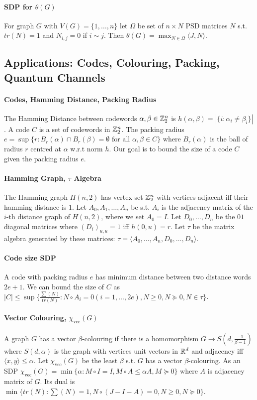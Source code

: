 \documentclass[letterpaper,11pt,oneside,onecolumn]{article}
\begin{document}
\paragraph{SDP for $\theta(G)$} For graph $G$ with $V(G) = \{1,\dots,n\}$ let $\Omega$ be set of $n\times N$ PSD matrices $N$ s.t. $tr(N) = 1$ and $N_{i,j} = 0$ if $i\sim j$. Then $\theta(G) = \max_{N \in \Omega} \langle J, N\rangle$.
\subsection*{Applications: Codes, Colouring, Packing, Quantum Channels}
\paragraph{Codes, Hamming Distance, Packing Radius} The Hamming Distance between codewords $\alpha,\beta \in \mathbb{Z}^n_2$ is $h(\alpha,\beta) = |\{i:\alpha_i \neq \beta_i \}|$. A code $C$ is a set of codewords in $\mathbb{Z}^n_2$. The packing radius $e = \sup \{ r: B_r(\alpha) \cap B_r(\beta) = \emptyset \text{ for all } \alpha,\beta \in C\}$ where $B_r(\alpha)$ is the ball of radius $r$ centred at $\alpha$ w.r.t norm $h$. Our goal is to bound the size of a code $C$ given the packing radius $e$.
\paragraph{Hamming Graph, $\tau$ Algebra} The Hamming graph $H(n,2)$ has vertex set $\mathbb{Z}^n_2$ with vertices adjacent iff their hamming distance is $1$. Let $A_0, A_1, \dots, A_n$ be s.t. $A_i$ is the adjacency matrix of the $i$-th distance graph of $H(n,2)$, where we set $A_0 = I$. Let $D_0,\dots, D_n$ be the $0$$1$ diagonal matrices where $(D_i)_{u,u}= 1$ iff $h(0,u) = r$. Let $\tau$ be the matrix algebra generated by these matrices: $\tau = \langle A_0, \dots, A_n, D_0, \dots, D_n \rangle$.
\paragraph{Code size SDP} A code with packing radius $e$ has minimum distance between two distance words $2e+1$. We can bound the size of $C$ as $|C| \leq \sup \{ \frac{\sum(N)}{tr(N)} : N \circ A_i = 0 (i = 1, \dots, 2e), N \geq 0, N \succcurlyeq 0, N \in \tau \}$.
\paragraph{Vector Colouring, $\chi_{\text{vec}}(G)$} A graph $G$ has a vector $\beta$-colouring if there is a homomorphism $G \rightarrow S(d, \frac{-1}{\beta -1})$ where $S(d,\alpha)$ is the graph with vertices unit vectors in $\mathbb{R}^d$ and adjacency iff $\langle x, y\rangle \leq \alpha$. Let $\chi_{\text{vec}}(G)$ be the least $\beta$ s.t. $G$ has a vector $\beta$-colouring. As an SDP $\chi_{\text{vec}}(G) = \min\{\alpha: M\circ I = I, M\circ A\leq \alpha A, M \succcurlyeq 0\}$ where $A$ is adjacency matrix of $G$. Its dual is $\min\{tr(N) : \sum(N) = 1, N\circ(J-I-A) = 0, N \geq 0, N \succcurlyeq 0\}$.
\end{document}
